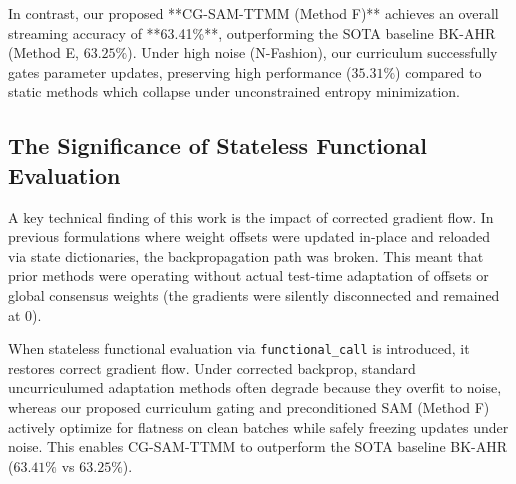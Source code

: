\documentclass{article}
\theoremstyle{plain}
\theoremstyle{definition}
\theoremstyle{remark}
\begin{document}
In contrast, our proposed **CG-SAM-TTMM (Method F)** achieves an overall streaming accuracy of **63.41\%**, outperforming the SOTA baseline BK-AHR (Method E, $63.25\%$). Under high noise (N-Fashion), our curriculum successfully gates parameter updates, preserving high performance ($35.31\%$) compared to static methods which collapse under unconstrained entropy minimization.

\subsection{The Significance of Stateless Functional Evaluation}
A key technical finding of this work is the impact of corrected gradient flow. In previous formulations where weight offsets were updated in-place and reloaded via state dictionaries, the backpropagation path was broken. This meant that prior methods were operating without actual test-time adaptation of offsets or global consensus weights (the gradients were silently disconnected and remained at 0). 

When stateless functional evaluation via \texttt{functional\_call} is introduced, it restores correct gradient flow. Under corrected backprop, standard uncurriculumed adaptation methods often degrade because they overfit to noise, whereas our proposed curriculum gating and preconditioned SAM (Method F) actively optimize for flatness on clean batches while safely freezing updates under noise. This enables CG-SAM-TTMM to outperform the SOTA baseline BK-AHR ($63.41\%$ vs $63.25\%$).
\end{document}
